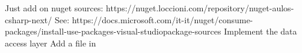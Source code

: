 \markdownRendererInterblockSeparator
{}\markdownRendererInterblockSeparator
{}\markdownRendererInterblockSeparator
{}Just add on nuget sources:\markdownRendererInterblockSeparator
{}https://nuget.loccioni.com/repository/nuget-aulos-csharp-next/\markdownRendererInterblockSeparator
{}See: https://docs.microsoft.com/it-it/nuget/consume-packages/install-use-packages-visual-studio\markdownRendererHash{}package-sources\markdownRendererInterblockSeparator
{}\markdownRendererInterblockSeparator
{}\markdownRendererUlBegin
\markdownRendererUlItem Implement the data access layer\markdownRendererUlItemEnd 
\markdownRendererUlItem Add a  file in \markdownRendererUlItemEnd 
